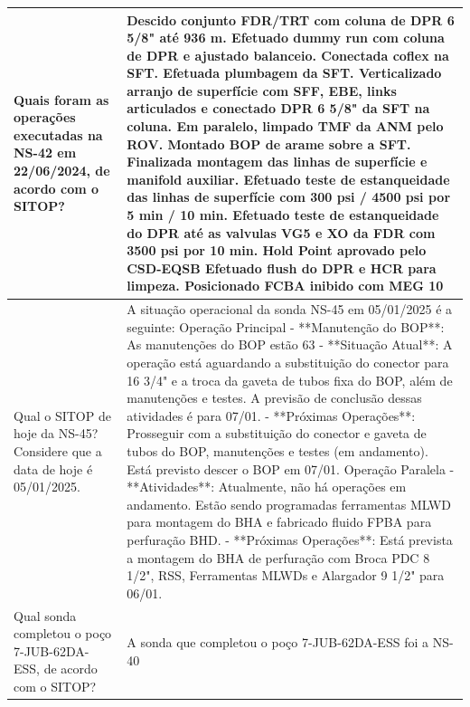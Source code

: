\begin{landscape}
\begin{longtable}{|p{3cm}|p{22cm}|}
Quais foram as operações executadas na NS-42 em 22/06/2024, de acordo com o SITOP?  & 
        Descido conjunto FDR/TRT com coluna de DPR 6 5/8" até 936 m.
        Efetuado dummy run com coluna de DPR e ajustado balanceio.
        Conectada coflex na SFT.
        Efetuada plumbagem da SFT.
        Verticalizado arranjo de superfície com SFF, EBE, links articulados e conectado DPR 6 5/8" da SFT na coluna.
        Em paralelo, limpado TMF da ANM pelo ROV.
        Montado BOP de arame sobre a SFT.
        \newline        Finalizada montagem das linhas de superfície e manifold auxiliar.
        Efetuado teste de estanqueidade das linhas de superfície com 300 psi / 4500 psi por 5 min / 10 min.
        Efetuado teste de estanqueidade do DPR até as valvulas VG5 e XO da FDR com 3500 psi por 10 min. Hold Point aprovado pelo CSD-EQSB
        Efetuado flush do DPR e HCR para limpeza.
        Posicionado FCBA inibido com MEG 10%
        \newline        \\ \hline

Qual  o SITOP de hoje da NS-45? Considere que a data de hoje é 05/01/2025. & A situação operacional da sonda NS-45 em 05/01/2025 é a seguinte:
        \newline         Operação Principal
        - **Manutenção do BOP**: As manutenções do BOP estão 63%
        - **Situação Atual**: A operação está aguardando a substituição do conector para 16 3/4" e a troca da gaveta de tubos fixa do BOP, além de manutenções e testes. A previsão de conclusão dessas atividades é para 07/01.
        - **Próximas Operações**: Prosseguir com a substituição do conector e gaveta de tubos do BOP, manutenções e testes (em andamento). Está previsto descer o BOP em 07/01.
        \newline         Operação Paralela
        - **Atividades**: Atualmente, não há operações em andamento. Estão sendo programadas ferramentas MLWD para montagem do BHA e fabricado fluido FPBA para perfuração BHD.
        - **Próximas Operações**: Está prevista a montagem do BHA de perfuração com Broca PDC 8 1/2", RSS, Ferramentas MLWDs e Alargador 9 1/2" para 06/01.
        \\ \hline

Qual sonda completou o poço 7-JUB-62DA-ESS, de acordo com o SITOP?  & A sonda que completou o poço 7-JUB-62DA-ESS foi a NS-40 \\ \hline

 
        \end{longtable}
    \end{landscape}

